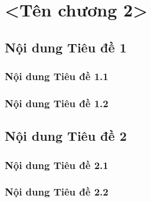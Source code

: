\chapter{<Tên chương 2>}

\section{Nội dung Tiêu đề 1}
\subsection{Nội dung Tiêu đề 1.1}
\subsection{Nội dung Tiêu đề 1.2}

\section{Nội dung Tiêu đề 2}
\subsection{Nội dung Tiêu đề 2.1}
\subsection{Nội dung Tiêu đề 2.2}